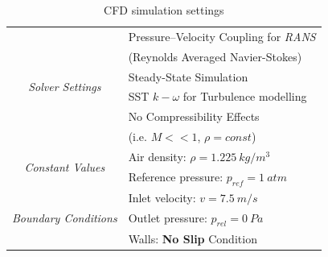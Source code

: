 \begin{table}[t]
\caption{CFD simulation settings}
\label{table:cfd}
	\centering
	\begin{tabular}{c|l}
	    \toprule
	    \multirow{6}{*}{\textit{Solver Settings}} & Pressure--Velocity Coupling for \emph{RANS} \\ & (Reynolds Averaged Navier-Stokes) \\ & Steady-State Simulation\\ & SST $k - \omega$ for Turbulence modelling \\ & No Compressibility Effects \\ & (i.e. $M<<1$, $\rho = const$)\\
		\midrule
		\multirow{2}{*}{\textit{Constant Values}} & Air density: $\rho = \SI{1.225}{kg/m^3}$ \\ & Reference pressure: $p_{ref} = \SI{1}{atm}$\\
        \midrule
        \multirow{3}{*}{\textit{Boundary Conditions}} & Inlet velocity: $v = \SI{7.5}{m/s}$ \\ & Outlet pressure: $p_{rel} = \SI{0}{Pa}$\\ & Walls: \textbf{No Slip} Condition\\
		\bottomrule
	\end{tabular}
\end{table}

